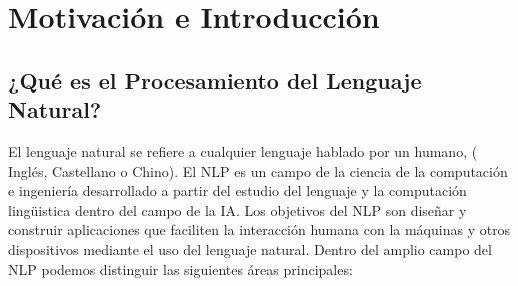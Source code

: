 \chapter{Motivación e Introducción}\label{ch:introduction}

\section{¿Qué es el Procesamiento del Lenguaje Natural?}
\label{sec:whatisnlp}

El lenguaje natural se refiere a cualquier lenguaje hablado por un humano, (\eg
Inglés, Castellano o Chino). El \ac{NLP} es un campo de la
ciencia de la computación e ingeniería desarrollado a partir del estudio del
lenguaje y la computación lingüistica dentro del campo de la \ac{IA}. Los
objetivos del \ac{NLP} son diseñar y construir aplicaciones que faciliten la
interacción humana con la máquinas y otros dispositivos mediante el uso del
lenguaje natural. Dentro del amplio campo del \ac{NLP} podemos distinguir las
siguientes áreas principales:

